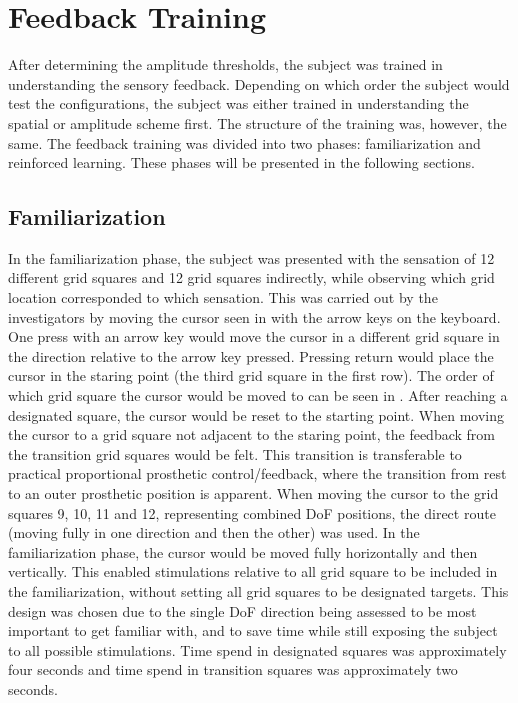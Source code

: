 
\section{Feedback Training}
After determining the amplitude thresholds, the subject was trained in understanding the sensory feedback. Depending on which order the subject would test the configurations, the subject was either trained in understanding the spatial or amplitude scheme first. The structure of the training was, however, the same. The feedback training was divided into two phases: familiarization and reinforced learning. These phases will be presented in the following sections.

\subsection{Familiarization} \label{sec:meth:FBtrainingFam}
In the familiarization phase, the subject was presented with the sensation of 12 different grid squares and 12 grid squares indirectly, while observing which grid location corresponded to which sensation. This was carried out by the investigators by moving the cursor seen in  with the arrow keys on the keyboard. One press with an arrow key would move the cursor in a different grid square in the direction relative to the arrow key pressed. Pressing return would place the cursor in the staring point (the third grid square in the first row). The order of which grid square the cursor would be moved to can be seen in . After reaching a designated square, the cursor would be reset to the starting point. When moving the cursor to a grid square not adjacent to the staring point, the feedback from the transition grid squares would be felt. This transition is transferable to practical proportional prosthetic control/feedback, where the transition from rest to an outer prosthetic position is apparent. When moving the cursor to the grid squares 9, 10, 11 and 12, representing combined DoF positions, the direct route (moving fully in one direction and then the other) was used. In the familiarization phase, the cursor would be moved fully horizontally and then vertically. This enabled stimulations relative to all grid square to be included in the familiarization, without setting all grid squares to be designated targets. This design was chosen due to the single DoF direction being assessed to be most important to get familiar with, and to save time while still exposing the subject to all possible stimulations. Time spend in designated squares was approximately four seconds and time spend in transition squares was approximately two seconds.

